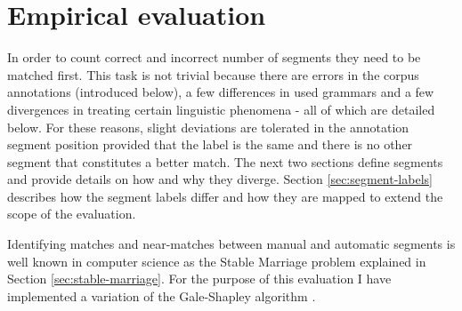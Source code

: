 \chapter{Empirical evaluation}
\label{ch:evaluation}


    In order to count correct and incorrect number of segments they need to be matched first. This task is not trivial because there are errors in the corpus annotations (introduced below), a few differences in used grammars and a few divergences in treating certain linguistic phenomena - all of which are detailed below. For these reasons, slight deviations are tolerated in the annotation segment position provided that the label is the same and there is no other segment that constitutes a better match. The next two sections define segments and provide details on how and why they diverge. Section \ref{sec:segment-labels} describes how the segment labels differ and how they are mapped to extend the scope of the evaluation. 

    Identifying matches and near-matches between manual and automatic segments is well known in computer science as the Stable Marriage problem explained in Section \ref{sec:stable-marriage}. For the purpose of this evaluation I have implemented a variation of the Gale-Shapley algorithm \citep{Gale1962}. %

    

